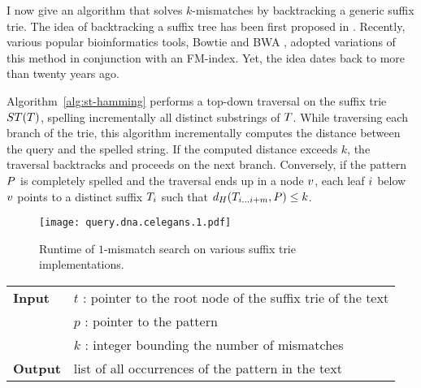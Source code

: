I now give an algorithm that solves $k$-mismatches by backtracking a generic suffix trie.
The idea of backtracking a suffix tree has been first proposed in \citep{Ukkonen1993}.
Recently, various popular bioinformatics tools, \eg Bowtie \citep{Langmead2009} and BWA \citep{Li2009}, adopted variations of this method in conjunction with an FM-index.
Yet, the idea dates back to more than twenty years ago.

Algorithm~\ref{alg:st-hamming} performs a top-down traversal on the suffix trie $ST(T)$, spelling incrementally all distinct substrings of $T$.
While traversing each branch of the trie, this algorithm incrementally computes the distance between the query and the spelled string.
If the computed distance exceeds $k$, the traversal backtracks and proceeds on the next branch.
Conversely, if the pattern $P$ is completely spelled and the traversal ends up in a node $v$, each leaf $i$ below $v$ points to a distinct suffix ${T}_{i}$ such that $d_H({T}_{{i}\dots{i+m}}, P) \leq k$.

\begin{figure}[b]
\begin{center}
\caption[$k$-mismatches runtime]{Runtime of $1$-mismatch search on various suffix trie implementations.}
\label{fig:query-dna-apx}
\texttt{[image: query.dna.celegans.1.pdf]}
\end{center}
\end{figure}

\begin{figure*}[t]
\begin{center}
\begin{minipage}[t]{.8\textwidth}
\begin{algorithm}[H]
\begin{tabular}{ll}
\textbf{Input}  & $t$ : pointer to the root node of the suffix trie of the text\\
 			    & $p$ : pointer to the pattern\\
 			    & $k$ : integer bounding the number of mismatches\\
\textbf{Output} & list of all occurrences of the pattern in the text\\
\end{tabular}
\begin{algorithmic}[1]
\Else
		\State \Report {}
		\Repeat
			\State {}
			\State {}
			\State {}
		\Until {}
	\EndIf
\EndIf
\end{algorithmic}
\label{alg:st-hamming}
\end{algorithm}
\end{minipage}
\end{center}
\end{figure*}

